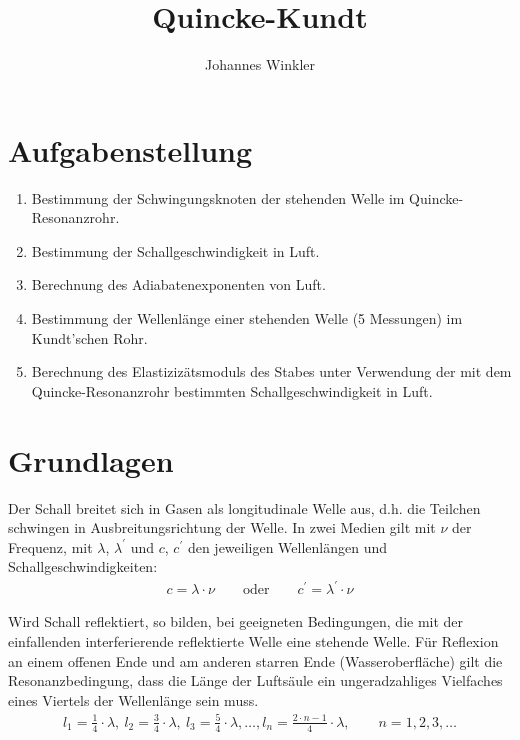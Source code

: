 \documentclass{article}
\title{Quincke-Kundt}
\author{Johannes Winkler}
\date{}
\begin{document}
 
 
 
\pagestyle{fancy}


\tableofcontents

\newpage


\section{Aufgabenstellung}
\begin{enumerate}
\item Bestimmung der Schwingungsknoten der stehenden Welle im Quincke-Resonanzrohr.
\item Bestimmung der Schallgeschwindigkeit in Luft.
\item Berechnung des Adiabatenexponenten von Luft.
\item Bestimmung der Wellenlänge einer stehenden Welle (5 Messungen) im Kundt'schen Rohr.
\item Berechnung des Elastizizätsmoduls des Stabes unter Verwendung der mit dem Quincke-Resonanzrohr bestimmten Schallgeschwindigkeit in Luft.
\end{enumerate}



\section{Grundlagen}
Der Schall breitet sich in Gasen als longitudinale Welle aus, d.h. die Teilchen schwingen in
Ausbreitungsrichtung der Welle. In zwei Medien gilt mit $\nu$ der Frequenz, mit $\lambda$, $\lambda^\prime$ und $c$, $c^\prime$ den jeweiligen Wellenlängen und Schallgeschwindigkeiten:
\begin{align}
\label{eq:clambda}
c = \lambda\cdot \nu \qquad \text{oder} \qquad c^\prime = \lambda^\prime\cdot \nu
\end{align}

Wird Schall reflektiert, so bilden, bei geeigneten Bedingungen, die mit der einfallenden interferierende reflektierte Welle eine stehende Welle. Für Reflexion an einem offenen Ende und am anderen starren Ende (Wasseroberfläche) gilt die Resonanzbedingung, dass die Länge der Luftsäule ein ungeradzahliges Vielfaches eines Viertels der Wellenlänge sein muss.
\begin{align}
l_1 = \frac14\cdot \lambda,~ l_2 = \frac34\cdot \lambda,~ l_3 = \frac54\cdot \lambda, \dots , l_n = \frac{2\cdot n-1}{4}\cdot \lambda, \qquad n=1,2,3,\dots
\end{align}
\end{document}
